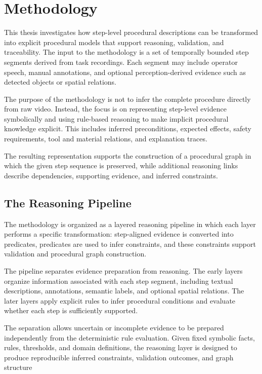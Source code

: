 \chapter{Methodology}
\label{cha:methodology}

This thesis investigates how step-level procedural descriptions can be transformed into explicit procedural models that support reasoning, validation, and traceability. The input to the methodology is a set of temporally bounded step segments derived from task recordings. Each segment may include operator speech, manual annotations, and optional perception-derived evidence such as detected objects or spatial relations.

The purpose of the methodology is not to infer the complete procedure directly from raw video. Instead, the focus is on representing step-level evidence symbolically and using rule-based reasoning to make implicit procedural knowledge explicit. This includes inferred preconditions, expected effects, safety requirements, tool and material relations, and explanation traces.

The resulting representation supports the construction of a procedural graph in which the given step sequence is preserved, while additional reasoning links describe dependencies, supporting evidence, and inferred constraints.

\section{The Reasoning Pipeline}
\label{sec:method-reasoning-pipeline}

The methodology is organized as a layered reasoning pipeline in which each layer performs a specific transformation: step-aligned evidence is converted into predicates, predicates are used to infer constraints, and these constraints support validation and procedural graph construction.

The pipeline separates evidence preparation from reasoning. The early layers organize information associated with each step segment, including textual descriptions, annotations, semantic labels, and optional spatial relations. The later layers apply explicit rules to infer procedural conditions and evaluate whether each step is sufficiently supported.

The separation allows uncertain or incomplete evidence to be prepared independently from the deterministic rule evaluation. Given fixed symbolic facts, rules, thresholds, and domain definitions, the reasoning layer is designed to produce reproducible inferred constraints, validation outcomes, and graph structure

